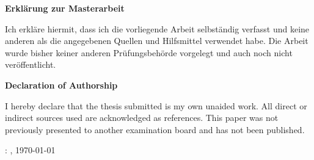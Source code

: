 \thispagestyle{empty}

\hfill
\vfill 


\begin{center}
\textbf{Erklärung zur Masterarbeit}

Ich erkläre hiermit, dass ich die vorliegende Arbeit selbständig verfasst und keine
anderen als die angegebenen Quellen und Hilfsmittel verwendet habe. Die Arbeit wurde
bisher keiner anderen Prüfungsbehörde vorgelegt und auch noch nicht veröffentlicht. 

\vspace{1cm}
\textbf{Declaration of Authorship}

I hereby declare that the thesis submitted is my own unaided work. All direct or indirect
sources used are acknowledged as references. This paper was not previously presented to
another examination board and has not been published.
\end{center}
\vspace{2cm}

\vfill

\noindent\myName: \textit{\myTitle}, \today \textcopyright\

%
%
%
%
%
